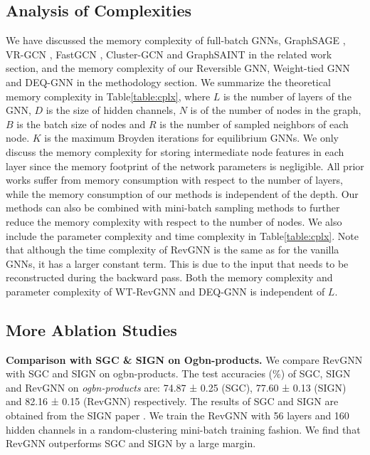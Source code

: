 \documentclass{article}
\newcommand{\tblLabel}{Table\xspace}
\newcommand{\mysection}[1]{\vspace{0pt}\noindent\textbf{#1.}}
\begin{document}
\subsection{Analysis of Complexities}
We have discussed the memory complexity of full-batch GNNs, GraphSAGE \citep{hamilton2017inductive}, VR-GCN \citep{chen2018stochastic}, FastGCN \citep{chen2018fastgcn}, Cluster-GCN \citep{chiang2019cluster} and GraphSAINT \citep{graphsaint-iclr20} in the related work section, and the memory complexity of our Reversible GNN, Weight-tied GNN and DEQ-GNN in the methodology section. We summarize the theoretical memory complexity in \tblLabel \ref{table:cplx}, where $L$ is the number of layers of the GNN, $D$ is the size of hidden channels, $N$ is of the number of nodes in the graph, $B$ is the batch size of nodes and $R$ is the number of sampled neighbors of each node. $K$ is the maximum Broyden iterations for equilibrium GNNs. We only discuss the memory complexity for storing intermediate node features in each layer since the memory footprint of the network parameters is negligible. All prior works suffer from memory consumption with respect to the number of layers, while the memory consumption of our methods is independent of the depth. Our methods can also be combined with mini-batch sampling methods to further reduce the memory complexity with respect to the number of nodes. We also include the parameter complexity and time complexity in \tblLabel \ref{table:cplx}. Note that although the time complexity of RevGNN is the same as for the vanilla GNNs, it has a larger constant term. This is due to the input that needs to be reconstructed during the backward pass. Both the memory complexity and parameter complexity of WT-RevGNN and DEQ-GNN is independent of $L$.

\subsection{More Ablation Studies}

\mysection{Comparison with SGC \& SIGN on Ogbn-products} 
We compare RevGNN with SGC \citep{wu2019simplifying} and SIGN \citep{sign_icml_grl2020} on ogbn-products. The test accuracies (\%) of SGC, SIGN and RevGNN on \emph{ogbn-products} are: 74.87 ± 0.25 (SGC), 77.60 ± 0.13 (SIGN) and 82.16 ± 0.15 (RevGNN) respectively.
The results of SGC and SIGN are obtained from the SIGN paper \citep{sign_icml_grl2020}. We train the RevGNN with 56 layers and 160 hidden channels in a random-clustering mini-batch training fashion. We find that RevGNN outperforms SGC and SIGN by a large margin.
\end{document}
